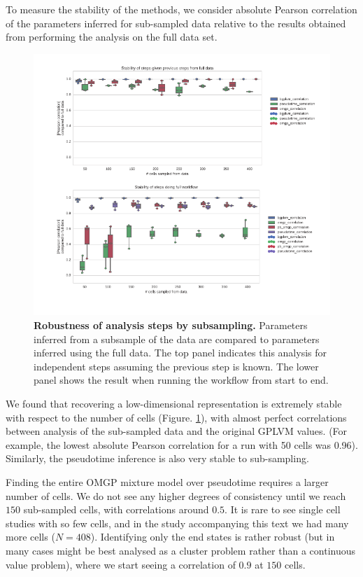 To measure the stability of the methods, we consider absolute Pearson correlation of the parameters inferred for sub-sampled data relative to the results obtained from performing the analysis on the full data set.

\begin{figure}
    \centering
    \includegraphics[width=\textwidth]{"fig-robustness"}
    \caption[Robustness of analysis steps by subsampling]{\textbf{Robustness of analysis steps by subsampling.} Parameters inferred from a subsample of the data are compared to parameters inferred using the full data. The top panel indicates this analysis for independent steps assuming the previous step is known. The lower panel shows the result when running the workflow from start to end.}
    \label{fig:robustness}
\end{figure}

We found that recovering a low-dimensional representation is extremely stable with respect to the number of cells (Figure. \ref{fig:robustness}), with almost perfect correlations between analysis of the sub-sampled data and the original GPLVM values. (For example, the lowest absolute Pearson correlation for a run with 50 cells was 0.96). Similarly, the pseudotime inference is also very stable to sub-sampling.

Finding the entire OMGP mixture model over pseudotime requires a larger number of cells. We do not see any higher degrees of consistency until we reach $ 150 $ sub-sampled cells, with correlations around $ 0.5 $. It is rare to see single cell studies with so few cells, and in the study accompanying this text we had many more cells ($ N = 408 $). Identifying only the end states is rather robust (but in many cases might be best analysed as a cluster problem rather than a continuous value problem), where we start seeing a correlation of $ 0.9 $ at $ 150 $ cells.

